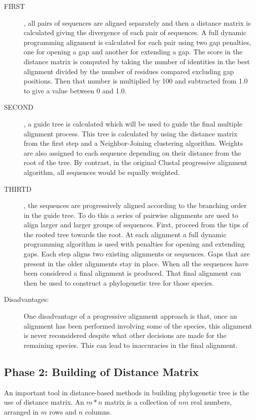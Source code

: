 \begin{description}
\item[FIRST], all pairs of sequences are aligned separately and then a distance 
matrix is calculated giving the divergence of each pair of sequences. A full 
dynamic programming alignment is calculated for each pair using two gap 
penalties, one for opening a gap and another for extending a gap. The score in the 
distance matrix is computed by taking the number of identities in the best 
alignment divided by the number of residues compared excluding gap positions. 
Then that number is multiplied by 100 and subtracted from 1.0 to give a value 
between 0 and 1.0.
\item[SECOND], a guide tree is calculated which will be used to guide the final 
multiple alignment process. This tree is calculated by using the distance matrix 
from the first step and a Neighbor-Joining clustering algorithm. Weights are also 
assigned to each sequence depending on their distance from the root of the tree. By 
contrast, in the original Clustal progressive alignment algorithm, all sequences 
would be equally weighted. 
\item[THIRTD], the sequences are progressively aligned according to the branching 
order in the guide tree. To do this a series of pairwise alignments are used to align 
larger and larger groups of sequences. First, proceed from the tips of the rooted 
tree towards the root. At each alignment a full dynamic programming algorithm is 
used with penalties for opening and extending gaps. Each step aligns two existing 
alignments or sequences. Gaps that are present in the older alignments stay in 
place. When all the sequences have been considered a final alignment is produced. 
That final alignment can then be used to construct a phylogenetic tree for those 
species. 
\item[Disadvantages:] One disadvantage of a progressive alignment approach is that, once an 
alignment has been performed involving some of the species, this alignment is 
never reconsidered despite what other decisions are made for the remaining species. 
This can lead to inaccuracies in the final alignment.
\end{description}

\subsection{Phase 2: Building of Distance Matrix} \label{phase2}
An important tool in distance-based methods in building phylogenetic 
tree is the use of distance matrix. An $m*n$ matrix is a collection 
of $nm$ real numbers, arranged in $m$ rows and $n$ columns.

